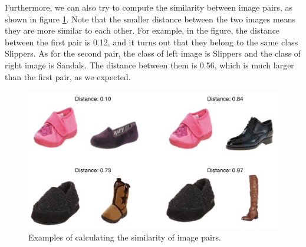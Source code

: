 Furthermore, we can also try to compute the similarity between image pairs, as shown in figure \ref{fig:similarity}. Note that the smaller distance between the two images means they are more similar to each other. For example, in the figure, the distance between the first pair is 0.12, and it turns out that they belong to the same class Slippers. As for the second pair, the class of left image is Slippers and the class of right image is Sandals. The distance between them is 0.56, which is much larger than the first pair, as we expected. 

\begin{figure}[h]
  \centering
  \includegraphics[width=\linewidth]{figs/similarity.png}
  \caption{Examples of calculating the similarity of image pairs.}
  \label{fig:similarity}
\end{figure}



